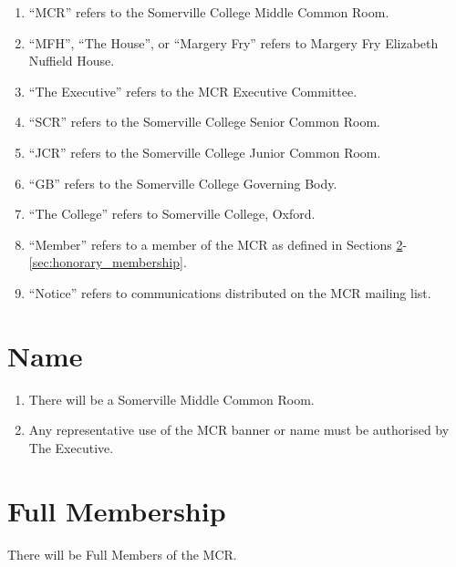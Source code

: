 \documentclass[11pt, a4paper]{article}
\begin{document}
\begin{enumerate}
    \item ``MCR'' refers to the Somerville College Middle Common Room.
    \item ``MFH'', ``The House'', or ``Margery Fry'' refers to Margery Fry Elizabeth Nuffield House.
    \item ``The Executive'' refers to the MCR Executive Committee.
    \item ``SCR'' refers to the Somerville College Senior Common Room.
    \item ``JCR'' refers to the Somerville College Junior Common Room.
    \item ``GB'' refers to the Somerville College Governing Body.
    \item ``The College'' refers to Somerville College, Oxford.
    \item ``Member'' refers to a member of the MCR as defined in Sections \ref{sec:full_membership}-\ref{sec:honorary_membership}.
    \item ``Notice'' refers to communications distributed on the MCR mailing list.
\end{enumerate}





\section{Name}
\label{sec:name}

\begin{enumerate}
    \item There will be a Somerville Middle Common Room.
    \item Any representative use of the MCR banner or name must be authorised by The Executive.
\end{enumerate}





\section{Full Membership}
\label{sec:full_membership}

There will be Full Members of the MCR.
\end{document}
